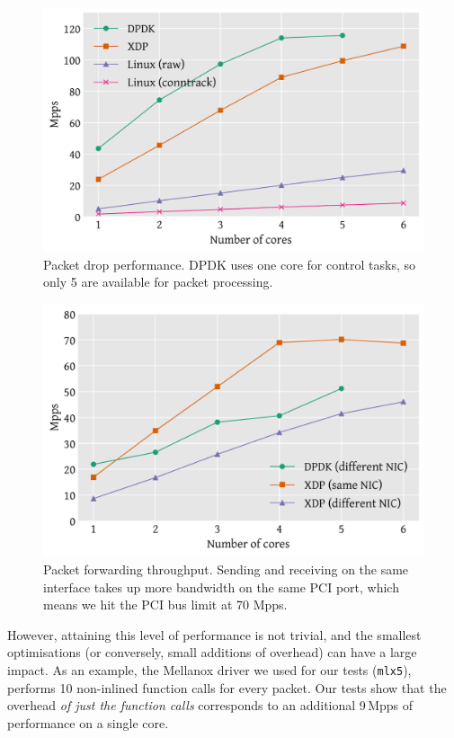 \documentclass[sigconf]{acmart}
\begin{document}
\begin{figure}[t]
\centering
\includegraphics[width=\linewidth]{images/drop-test.pdf}
\caption{\label{fig:drop-test} Packet drop performance. DPDK uses one core for
  control tasks, so only 5 are available for packet processing.}
\end{figure}

\begin{figure}[t]
\centering
\includegraphics[width=\linewidth]{images/redirect-test.pdf}
\caption{\label{fig:redirect-test} Packet forwarding throughput. Sending and
  receiving on the same interface takes up more bandwidth on the same PCI port,
  which means we hit the PCI bus limit at 70 Mpps.}
\end{figure}

However, attaining this level of performance is not trivial, and the smallest
optimisations (or conversely, small additions of overhead) can have a large
impact. As an example, the Mellanox driver we used for our tests
(\texttt{mlx5}), performs 10 non-inlined function calls for every packet. Our
tests show that the overhead \emph{of just the function calls} corresponds to an
additional 9\,Mpps of performance on a single core.
\end{document}
